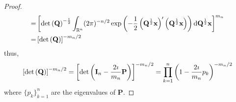 \begin{proof}
\begin{equation*}
\begin{aligned}
			= & \left[\operatorname{det}\left({\bf Q}\right)^{-\frac{1}{2}}\int_{{\mathbb R}^{n}}(2\pi)^{-n/2}\exp\left(-\frac{1}{2}\left({\bf Q}^{\frac{1}{2}}{\bf x}\right)^{\prime}\left({\bf Q}^{\frac{1}{2}}{\bf x}\right)\right)\mathop{}\!\mathrm{d}{\bf Q}^{\frac{1}{2}}{\bf x}\right]^{m_{n}} \\
			= & \left[\operatorname{det}\left({\bf Q}\right)\right]^{-m_{n}/2}
		\end{aligned}
	\end{equation*}
	thus,
	\begin{equation}
		\left[\operatorname{det}\left({\bf Q}\right)\right]^{-m_{n}/2}=\left[\operatorname{det}\left(\mathbf{I}_{n}-\frac{2\imath}{m_{n}}\mathbf{P}\right)\right]^{-m_{n}/2}=\prod_{k=1}^{n}\left(1-\frac{2\imath}{m_n}p_{k}\right)^{-m_{n}/2}
		\label{eq:characteristic-function-wishart-result-1}
	\end{equation}
	where $\{p_{k}\}_{k=1}^{n}$ are the eigenvalues of $\mathbf{P}$.


\end{proof}
